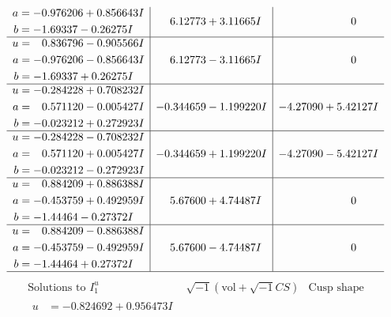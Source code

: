 \documentclass[1p]{elsarticle_modified}
\theoremstyle{definition}
\newcommand{\I}{\sqrt{-1}}
\begin{document}
$$\begin{array}{c|c|c}
\begin{aligned}
a &= -0.976206 + 0.856643 I \\
b &= -1.69337 - 0.26275 I\end{aligned}
 & \phantom{-}6.12773 + 3.11665 I & \phantom{-0.000000 } 0 \\ \hline\begin{aligned}
u &= \phantom{-}0.836796 - 0.905566 I \\
a &= -0.976206 - 0.856643 I \\
b &= -1.69337 + 0.26275 I\end{aligned}
 & \phantom{-}6.12773 - 3.11665 I & \phantom{-0.000000 } 0 \\ \hline\begin{aligned}
u &= -0.284228 + 0.708232 I \\
a &= \phantom{-}0.571120 - 0.005427 I \\
b &= -0.023212 + 0.272923 I\end{aligned}
 & -0.344659 - 1.199220 I & -4.27090 + 5.42127 I \\ \hline\begin{aligned}
u &= -0.284228 - 0.708232 I \\
a &= \phantom{-}0.571120 + 0.005427 I \\
b &= -0.023212 - 0.272923 I\end{aligned}
 & -0.344659 + 1.199220 I & -4.27090 - 5.42127 I \\ \hline\begin{aligned}
u &= \phantom{-}0.884209 + 0.886388 I \\
a &= -0.453759 + 0.492959 I \\
b &= -1.44464 - 0.27372 I\end{aligned}
 & \phantom{-}5.67600 + 4.74487 I & \phantom{-0.000000 } 0 \\ \hline\begin{aligned}
u &= \phantom{-}0.884209 - 0.886388 I \\
a &= -0.453759 - 0.492959 I \\
b &= -1.44464 + 0.27372 I\end{aligned}
 & \phantom{-}5.67600 - 4.74487 I & \phantom{-0.000000 } 0\\
 \hline 
 \end{array}$$\newpage$$\begin{array}{c|c|c}  
\text{Solutions to }I^u_{1}& \I (\text{vol} + \sqrt{-1}CS) & \text{Cusp shape}\\
 \hline 
\begin{aligned}
u &= -0.824692 + 0.956473 I \\

\end{aligned}
\end{array}$$
\end{document}
